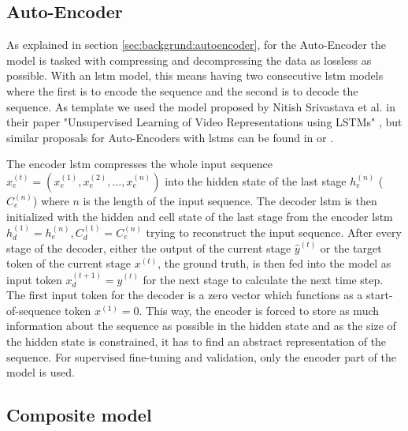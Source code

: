 \subsection{Auto-Encoder} \label{sec:experiments:lstm_auto_encoder}

As explained in section \ref{sec:backgrund:autoencoder}, for the Auto-Encoder the model is tasked with compressing and decompressing the data as lossless as possible. With an \gls{lstm} model, this means having two consecutive \gls{lstm} models where the first is to encode the sequence and the second is to decode the sequence. As template we used the model proposed by Nitish Srivastava et al. in their paper "Unsupervised Learning of Video Representations using LSTMs" \cite{unsupervised_learning_lstms}, but similar proposals for Auto-Encoders with \glspl{lstm} can be found in \cite{unsupervised_learning_lstms_timeseries} or \cite{lstm_anomaly_detection}. \par
The encoder \gls{lstm} compresses the whole input sequence $x_e^{(t)} = (x_e^{(1)}, x_e^{(2)}, ..., x_e^{(n)})$ into the hidden state of the last stage $h_e^{(n)}$ ($C_e^{(n)}$) where $n$ is the length of the input sequence. The decoder \gls{lstm} is then initialized with the hidden and cell state of the last stage from the encoder \gls{lstm} $h_d^{(1)} = h_e^{(n)}, C_d^{(1)} = C_e^{(n)}$ trying to reconstruct the input sequence. After every stage of the decoder, either the output of the current stage $\hat{y}^{(t)}$ or the target token of the current stage $x^{(t)}$, the ground truth, is then fed into the model as input token  $x_d^{(t+1)} = \hat{y}^{(t)}$ for the next stage to calculate the next time step. The first input token for the decoder is a zero vector which functions as a start-of-sequence token $x^{(1)} = 0$. This way, the encoder is forced to store as much information about the sequence as possible in the hidden state and as the size of the hidden state is constrained, it has to find an abstract representation of the sequence. For supervised fine-tuning and validation, only the encoder part of the model is used. 

\subsection{Composite model} \label{sec:experiments:lstm_composite}

